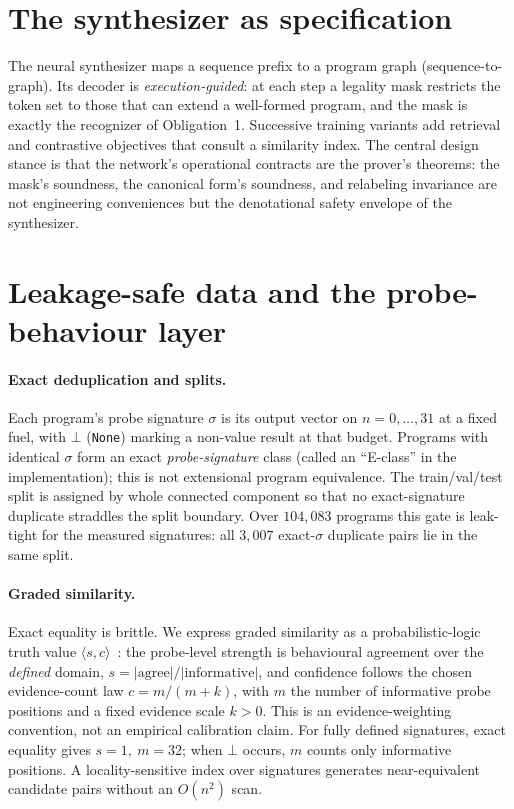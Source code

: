 \documentclass[11pt]{article}
\newcommand{\code}[1]{\texttt{#1}}
\newcommand{\sig}{\ensuremath{\sigma}}
\begin{document}
\section{The synthesizer as specification}
\label{sec:synth}

The neural synthesizer maps a sequence prefix to a program graph (sequence-to-graph). Its
decoder is \emph{execution-guided}: at each step a legality mask restricts the token set to
those that can extend a well-formed program, and the mask is exactly the recognizer of
Obligation~1. Successive training variants add retrieval and contrastive objectives that
consult a similarity index. The
central design stance is that the network's operational contracts are the prover's
theorems: the mask's soundness, the canonical form's soundness, and relabeling invariance
are not engineering conveniences but the denotational safety envelope of the synthesizer.

\section{Leakage-safe data and the probe-behaviour layer}
\label{sec:extensional}

\paragraph{Exact deduplication and splits.} Each program's probe signature \sig{} is its
output vector on $n=0,\dots,31$ at a fixed fuel, with $\bot$ (\code{None}) marking a
non-value result at that budget. Programs with identical \sig{} form an exact
\emph{probe-signature} class (called an ``E-class'' in the implementation); this is not
extensional program equivalence. The train/val/test split is assigned by whole connected
component so that no exact-signature duplicate straddles the split boundary. Over
$104{,}083$ programs this gate is leak-tight for the measured signatures: all $3{,}007$
exact-\sig{} duplicate pairs lie in the same split.

\paragraph{Graded similarity.} Exact equality is brittle. We express graded similarity as a
probabilistic-logic truth value $\langle s,c\rangle$~\cite{pln2009}: the probe-level
strength is behavioural agreement over the \emph{defined} domain,
$s = |{\text{agree}}| / |{\text{informative}}|$, and confidence follows the chosen
evidence-count law $c = m/(m+k)$, with $m$ the number of informative probe positions and a
fixed evidence scale $k>0$. This is an evidence-weighting convention, not an empirical
calibration claim. For fully defined signatures, exact equality gives $s=1,\ m=32$; when
$\bot$ occurs, $m$ counts only informative positions. A locality-sensitive index over
signatures generates near-equivalent candidate pairs without an $O(n^2)$ scan.
\end{document}
